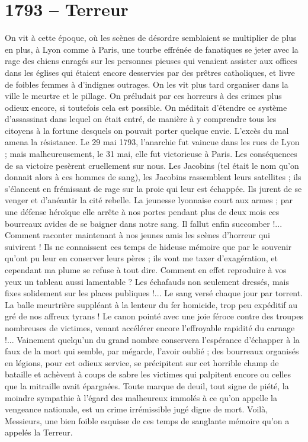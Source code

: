 \section*{1793 -- Terreur}
On vit à cette époque, où les scènes de désordre semblaient se multiplier de plus en plus, à Lyon comme à Paris, une tourbe effrénée de fanatiques se jeter avec la rage des chiens enragés sur les personnes pieuses qui venaient assister aux offices dans les églises qui étaient encore desservies par des prêtres catholiques, et livre de foibles femmes à d'indignes outrages. On les vit plus tard organiser dans la ville le meurtre et le pillage. On préludait par ces horreurs à des crimes plus odieux encore, si toutefois cela est possible. On méditait d'étendre ce système d'assassinat dans lequel on était entré, de manière à y comprendre tous les citoyens à la fortune desquels on pouvait porter quelque envie. L'excès du mal amena la résistance. Le 29 mai 1793, l'anarchie fut vaincue dans les rues de Lyon ; mais malheureusement, le 31 mai, elle fut victorieuse à Paris. Les conséquences de sa victoire pesèrent cruellement sur nous. Les Jacobins (tel était le nom qu'on donnait alors à ces hommes de sang), les Jacobins rassemblent leurs satellites ; ils s'élancent en frémissant de rage sur la proie qui leur est échappée. Ils jurent de se venger et d'anéantir la cité rebelle. La jeunesse lyonnaise court aux armes ; par une défense héroïque elle arrête à nos portes pendant plus de deux mois ces bourreaux avides de se baigner dans notre sang. Il fallut enfin succomber !... Comment raconter maintenant à nos jeunes amis les scènes d'horreur
qui suivirent ! Ils ne connaissent ces temps de hideuse mémoire que par le souvenir qu'ont pu leur en conserver leurs pères ; ils vont me taxer d'exagération, et cependant ma plume se refuse à tout dire. Comment en effet reproduire à vos yeux un tableau aussi lamentable ? Les échafauds non seulement dressés, mais fixes solidement sur les places publiques !... Le sang versé chaque jour par torrent. La balle meurtrière suppléant à la lenteur du fer homicide, trop peu expéditif au gré de nos affreux tyrans ! Le canon pointé avec une joie féroce contre des troupes nombreuses de victimes, venant accélérer encore l'effroyable rapidité du carnage !... Vainement quelqu'un du grand nombre conservera l'espérance d'échapper à la faux de la mort qui semble, par mégarde, l'avoir oublié ; des bourreaux organisés en légions, pour cet odieux service, se précipitent sur cet horrible champ de bataille et achèvent à coups de sabre les victimes qui palpitent encore ou celles que la mitraille avait épargnées. Toute marque de deuil, tout signe de piété, la moindre sympathie à l'égard des malheureux immolés à ce qu'on appelle la vengeance nationale, est un crime irrémissible jugé digne de mort. Voilà, Messieurs, une bien foible esquisse de ces temps de sanglante mémoire qu'on a appelés la Terreur.

